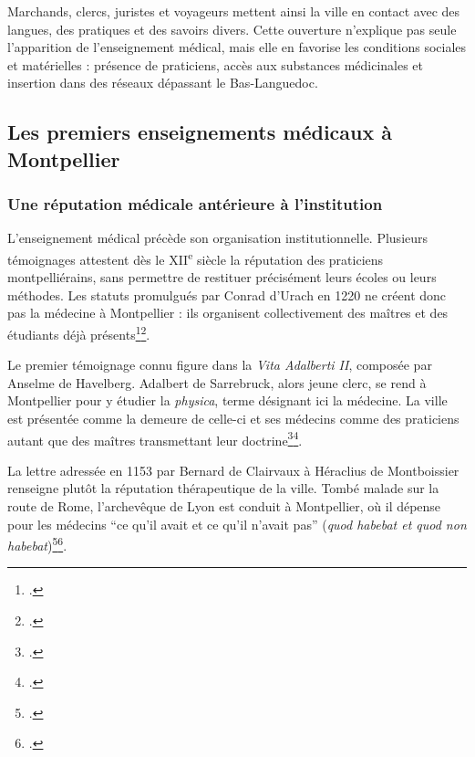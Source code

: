 Marchands, clercs, juristes et voyageurs mettent ainsi la ville en contact avec des langues, des pratiques et des savoirs divers. Cette ouverture n'explique pas seule l'apparition de l'enseignement médical, mais elle en favorise les conditions sociales et matérielles : présence de praticiens, accès aux substances médicinales et insertion dans des réseaux dépassant le Bas-Languedoc.

\subsection{Les premiers enseignements médicaux à Montpellier}

\subsubsection{Une réputation médicale antérieure à l'institution}

L'enseignement médical précède son organisation institutionnelle. Plusieurs témoignages attestent dès le XII\textsuperscript{e} siècle la réputation des praticiens montpelliérains, sans permettre de restituer précisément leurs écoles ou leurs méthodes. Les statuts promulgués par Conrad d'Urach en 1220 ne créent donc pas la médecine à Montpellier : ils organisent collectivement des maîtres et des étudiants déjà présents\footcite{Moulinier2003Montpellier}\footcite{Verger2021}.

Le premier témoignage connu figure dans la \emph{Vita Adalberti II}, composée par Anselme de Havelberg. Adalbert de Sarrebruck, alors jeune clerc, se rend à Montpellier pour y étudier la \emph{physica}, terme désignant ici la médecine. La ville est présentée comme la demeure de celle-ci et ses médecins comme des praticiens autant que des maîtres transmettant leur doctrine\footcite[p.~592--593]{Jaffe1867}\footcite{Touati2018}.

La lettre adressée en 1153 par Bernard de Clairvaux à Héraclius de Montboissier renseigne plutôt la réputation thérapeutique de la ville. Tombé malade sur la route de Rome, l'archevêque de Lyon est conduit à Montpellier, où il dépense pour les médecins \enquote{ce qu'il avait et ce qu'il n'avait pas} (\emph{quod habebat et quod non habebat})\footcite[col.~512B]{BernardClairvauxEpistola307}\footcite[46]{Touati2018}.

